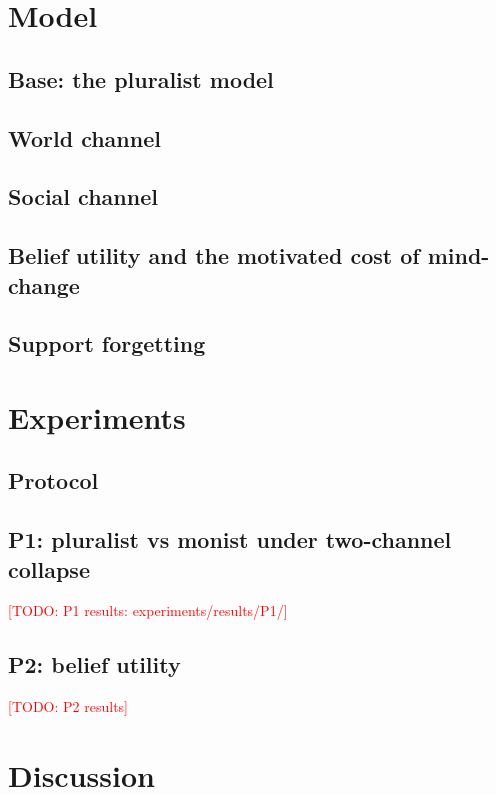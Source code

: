 \documentclass[11pt]{article}
\newcommand{\todo}[1]{\textcolor{red}{[TODO: #1]}}
\begin{document}
\section{Model}
\subsection{Base: the pluralist model}
\subsection{World channel}
\subsection{Social channel}
\subsection{Belief utility and the motivated cost of mind-change}
\subsection{Support forgetting}

\section{Experiments}
\subsection{Protocol}
\subsection{P1: pluralist vs monist under two-channel collapse}
\todo{P1 results: experiments/results/P1/}
\subsection{P2: belief utility}
\todo{P2 results}

\section{Discussion}



\end{document}
